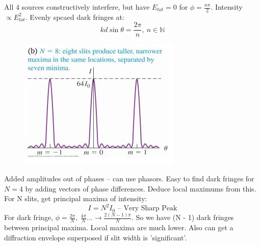\documentclass[a4paper, 11pt, normalem]{report}
\begin{document}
All 4 sources constructively interfere, but have $E_{tot} = 0$ for $\phi = \frac{n\pi}{2}$.
Intensity $\propto E_{tot}^{2}$.
Evenly spcaed dark fringes at:
\begin{equation}
    kd\sin{\theta} = \frac{2\pi}{n},~n \in \mathbb{N}
\end{equation}
\begin{figure}[H]
    \centering
    \includegraphics{Intense.jpg}
\end{figure}
Added amplitudes out of phases -- can use phasors.
Easy to find dark fringes for $N = 4$ by adding vectors of phase differences.
Deduce local maximums from this.
For N slits, get principal maxima of intensity:
\begin{equation}
    I = N^{2}I_{0}\text{ -- Very Sharp Peak}
\end{equation}
For dark fringe, $\phi = \frac{2\pi}{N},~\frac{4\pi}{N} ...\rightarrow \frac{2(N - 1)\pi}{N}$.
So we have (N - 1) dark fringes between principal maxima.
Local maxima are much lower.
Also can get a diffraction envelope superposed if slit width is 'significant'.
\end{document}
